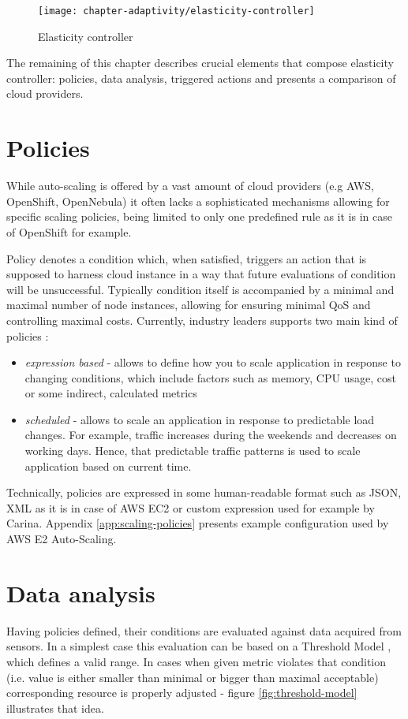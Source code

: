 \begin{figure}[!ht]
  \begin{center}
    \texttt{[image: chapter-adaptivity/elasticity-controller]}
  \end{center}
  \caption{Elasticity controller}
  \label{fig:elasticity-controller}
\end{figure}

The remaining of this chapter describes crucial elements that compose elasticity controller: policies, data analysis, triggered actions and presents a comparison of cloud providers.
 
\section{Policies}
While auto-scaling is offered by a vast amount of cloud providers (e.g AWS, OpenShift, OpenNebula) it often lacks a sophisticated mechanisms allowing for specific scaling policies, being limited to only one predefined rule as it is in case of OpenShift for example. 
 
Policy denotes a condition which, when satisfied, triggers an action that is supposed to harness cloud instance in a way that future evaluations of condition will be unsuccessful. Typically condition itself is accompanied by a minimal and maximal number of node instances, allowing for ensuring minimal QoS and controlling maximal costs. Currently, industry leaders supports two main kind of policies \cite{AmazonAutoScaling}:
\begin{itemize}
 \item \textit{expression based} - allows to define how you to scale application in response to changing conditions, which include factors such as memory, CPU usage, cost or some indirect, calculated metrics
 \item \textit{scheduled} - allows to scale an application in response to predictable load changes. For example, traffic increases during the weekends and decreases on working days. Hence, that predictable traffic patterns is used to scale application based on current time.
\end{itemize}

Technically, policies are expressed in some human-readable format such as JSON, XML as it is in case of AWS EC2 or custom expression used for example by Carina. Appendix \ref{app:scaling-policies} presents example configuration used by AWS E2 Auto-Scaling.

\section{Data analysis}
Having policies defined, their conditions are evaluated against data acquired from sensors. In a simplest case this evaluation can be based on a Threshold Model \cite{LiWoZh05}, which defines a valid range. In cases when given metric violates that condition (i.e. value is either smaller than minimal or bigger than maximal acceptable) corresponding resource is properly adjusted - figure \ref{fig:threshold-model} illustrates that idea.


